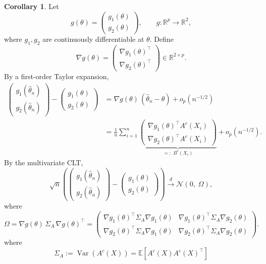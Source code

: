\documentclass[11pt]{article}
\theoremstyle{definition}
\newtheorem{corollary}{Corollary}[section]
\begin{document}
\begin{corollary}
Let
\[
g(\theta) =
\begin{pmatrix}
g_1(\theta) \\
g_2(\theta)
\end{pmatrix},
\qquad
g: \mathbb{R}^p \to \mathbb{R}^2,
\]
where $g_1, g_2$ are continuously differentiable at $\theta$.
Define
\[
\nabla g(\theta)
=
\begin{pmatrix}
\nabla g_1(\theta)^\top \\
\nabla g_2(\theta)^\top
\end{pmatrix}
\in \mathbb{R}^{2 \times p}.
\]
By a first-order Taylor expansion,
\[
\begin{aligned}
\begin{pmatrix}
g_1(\hat\theta_n) \\
g_2(\hat\theta_n)
\end{pmatrix}
-
\begin{pmatrix}
g_1(\theta) \\
g_2(\theta)
\end{pmatrix}
&=
\nabla g(\theta)\,(\hat\theta_n - \theta)
+ o_p(n^{-1/2}) \\
&=
\frac{1}{n} \sum_{i=1}^n
\underbrace{
\begin{pmatrix}
\nabla g_1(\theta)^\top A^c(X_i) \\
\nabla g_2(\theta)^\top A^c(X_i)
\end{pmatrix}
}_{=: \; B^c(X_i)}
+ o_p(n^{-1/2}).
\end{aligned}
\]
By the multivariate CLT,
\[
\sqrt{n}
\left(
\begin{pmatrix}
g_1(\hat\theta_n) \\
g_2(\hat\theta_n)
\end{pmatrix}
-
\begin{pmatrix}
g_1(\theta) \\
g_2(\theta)
\end{pmatrix}
\right)
\xrightarrow{d}
\mathcal{N}\!\left( 0, \; \Omega \right),
\]
where
\[
\Omega
=
\nabla g(\theta)\, \Sigma_A \, \nabla g(\theta)^\top
=
\begin{pmatrix}
\nabla g_1(\theta)^\top \Sigma_A \nabla g_1(\theta)
&
\nabla g_1(\theta)^\top \Sigma_A \nabla g_2(\theta)
\\
\nabla g_2(\theta)^\top \Sigma_A \nabla g_1(\theta)
&
\nabla g_2(\theta)^\top \Sigma_A \nabla g_2(\theta)
\end{pmatrix}.
\]
where
$$
\Sigma_A:=\operatorname{Var}\left(A^c(X)\right)=\mathbb{E}\left[A^c(X) A^c(X)^{\top}\right]
$$
\end{corollary}
\end{document}
